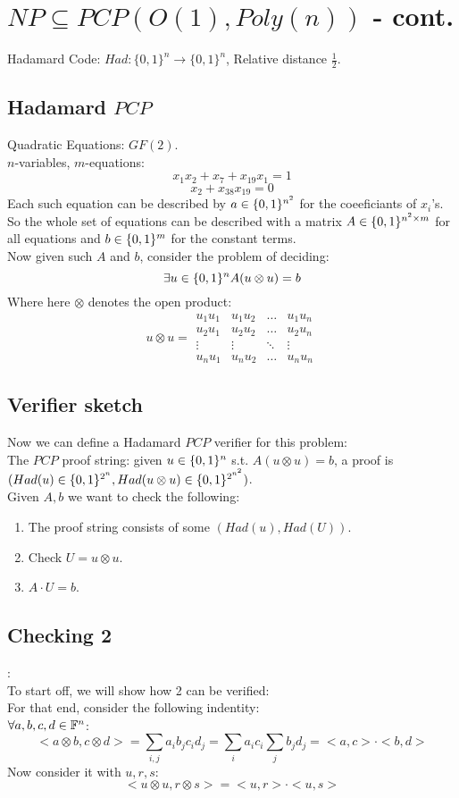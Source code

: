 \section*{$NP\subseteq PCP(O(1),Poly(n))$ - cont.}
Hadamard Code: $Had:\{0,1\}^n\rightarrow \{0,1\}^n$, Relative distance $\frac{1}{2}$.\\

\subsection*{Hadamard $PCP$}
Quadratic Equations: $GF(2)$.\\
$n$-variables, $m$-equations:
\[
	x_1x_2+x_7+x_{19}x_1=1
\]\[
	x_2+x_{38}x_{19}=0	
\]
Each such equation can be described by $a\in\{0,1\}^{n^2}$ for the
coeeficiants of $x_i$'s. So the whole set of equations
can be described with a matrix $A\in\{0,1\}^{n^2\times m}$ for
all equations and $b\in\{0,1\}^m$ for the constant terms.\\

Now given such $A$ and $b$, consider the problem of deciding:
\[
	\exists u\in\{0,1\}^n A(u\otimes u)=b	
\]
Where here $\otimes$ denotes the open product:
\[
	u\otimes u=\begin{matrix}
		u_1u_1&u_1u_2&\dots&u_1u_n\\
		u_2u_1&u_2u_2&\dots&u_2u_n\\
		\vdots&\vdots&\ddots&\vdots\\
		u_nu_1&u_nu_2&\dots&u_nu_n
	\end{matrix}
\]

\subsection*{Verifier sketch}
Now we can define a Hadamard $PCP$ verifier for this problem:\\
The $PCP$ proof string: given $u\in\{0,1\}^n$ s.t. $A(u\otimes u)=b$,
a proof is $(Had(u)\in\{0,1\}^{2^n}, Had(u\otimes u)\in\{0,1\}^{2^{n^2}})$.\\

Given $A,b$ we want to check the following:
\begin{enumerate}
	\item The proof string consists of some $(Had(u),Had(U))$.
	\item Check $U=u\otimes u$.
	\item $A\cdot U = b$.
\end{enumerate}

\subsection*{Checking 2}:\\
To start off, we will show how 2 can be verified:\\
For that end, consider the following indentity:\\
$\forall a,b,c,d\in\mathbb{F}^n$:
\[
	<a\otimes b, c\otimes d>
	=\sum_{i,j}a_ib_jc_id_j
	=\sum_ia_ic_i\sum_jb_jd_j
	=<a,c>\cdot<b,d>
\]
Now consider it with $u, r, s$:\\
\[
	<u\otimes u, r\otimes s>
	=<u,r>\cdot<u,s>
\]

